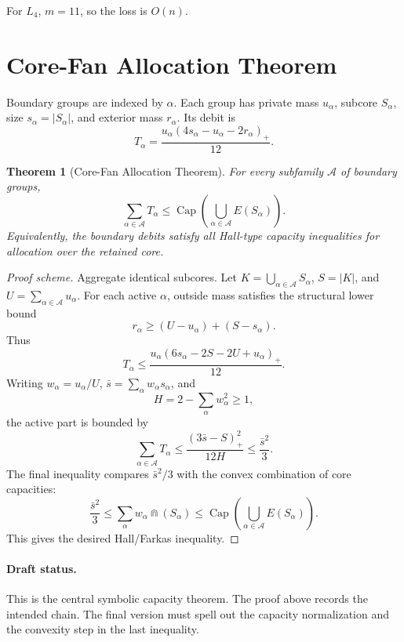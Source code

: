 \documentclass[11pt]{article}
\newtheorem{theorem}{Theorem}[section]
\theoremstyle{definition}
\newcommand{\CoreCap}{\operatorname{Cap}}
\newcommand{\calA}{\mathcal A}
\begin{document}
For \(L_4\), \(m=11\), so the loss is \(O(n)\).

\section{Core-Fan Allocation Theorem}

Boundary groups are indexed by \(\alpha\). Each group has private mass \(u_\alpha\), subcore \(S_\alpha\), size \(s_\alpha=|S_\alpha|\), and exterior mass \(r_\alpha\). Its debit is
\[
    T_\alpha
    =
    \frac{
    u_\alpha(4s_\alpha-u_\alpha-2r_\alpha)_+
    }{12}.
\]

\begin{theorem}[Core-Fan Allocation Theorem]\label{thm:core-fan}
For every subfamily \(\calA\) of boundary groups,
\[
    \sum_{\alpha\in\calA}T_\alpha
    \le
    \CoreCap\left(
    \bigcup_{\alpha\in\calA}E(S_\alpha)
    \right).
\]
Equivalently, the boundary debits satisfy all Hall-type capacity inequalities for allocation over the retained core.
\end{theorem}

\begin{proof}[Proof scheme]
Aggregate identical subcores. Let \(K=\bigcup_{\alpha\in\calA}S_\alpha\), \(S=|K|\), and \(U=\sum_{\alpha\in\calA}u_\alpha\). For each active \(\alpha\), outside mass satisfies the structural lower bound
\[
    r_\alpha\ge (U-u_\alpha)+(S-s_\alpha).
\]
Thus
\[
    T_\alpha
    \le
    \frac{
    u_\alpha(6s_\alpha-2S-2U+u_\alpha)_+
    }{12}.
\]
Writing \(w_\alpha=u_\alpha/U\), \(\bar s=\sum_\alpha w_\alpha s_\alpha\), and
\[
    H=2-\sum_\alpha w_\alpha^2\ge1,
\]
the active part is bounded by
\[
    \sum_{\alpha\in\calA}T_\alpha
    \le
    \frac{(3\bar s-S)_+^2}{12H}
    \le
    \frac{\bar s^2}{3}.
\]
The final inequality compares \(\bar s^2/3\) with the convex combination of core capacities:
\[
    \frac{\bar s^2}{3}
    \le
    \sum_\alpha w_\alpha \Cap(S_\alpha)
    \le
    \CoreCap\left(\bigcup_{\alpha\in\calA}E(S_\alpha)\right).
\]
This gives the desired Hall/Farkas inequality.
\end{proof}

\paragraph{Draft status.}
This is the central symbolic capacity theorem. The proof above records the intended chain. The final version must spell out the capacity normalization and the convexity step in the last inequality.
\end{document}
